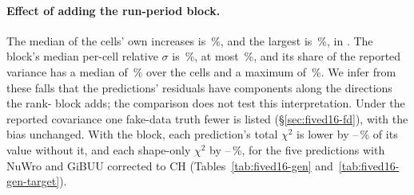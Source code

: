 \paragraph{Effect of adding the run-period block.} The median of the cells' own increases is \,\%, and the largest is \,\%, in . The block's median per-cell relative $\sigma$ is \,\%, at most \,\%, and its share of the reported variance has a median of \,\% over the cells and a maximum of \,\%. We infer from these falls that the predictions' residuals have components along the directions the rank- block adds; the comparison does not test this interpretation. Under the reported covariance one fake-data truth fewer is listed (\S\ref{sec:fived16-fd}), with the bias unchanged. With the block, each prediction's total $\chi^2$ is lower by --\,\% of its value without it, and each shape-only $\chi^2$ by --\,\%, for the five predictions with NuWro and GiBUU corrected to CH (Tables~\ref{tab:fived16-gen} and~\ref{tab:fived16-gen-target}).
